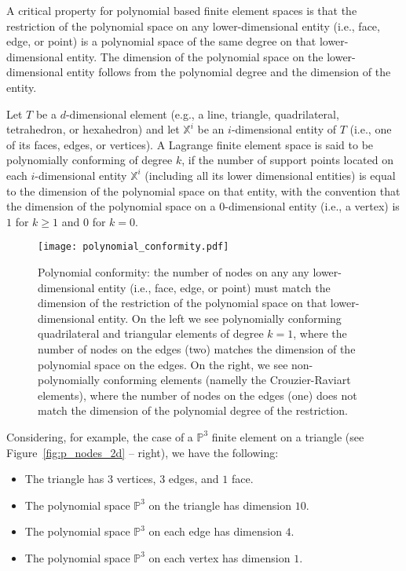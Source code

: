A critical property for polynomial based finite element spaces is that the restriction of the polynomial space on any lower-dimensional entity (i.e., face, edge, or point) is a polynomial space of the same degree on that lower-dimensional entity. The dimension of the polynomial space on the lower-dimensional entity follows from the polynomial degree and the dimension of the entity.

\begin{definition} 
Let $T$ be a $d$-dimensional element (e.g., a line, triangle, quadrilateral, tetrahedron, or hexahedron) and let $\mathbb{X}^i$ be an $i$-dimensional entity of $T$ (i.e., one of its faces, edges, or vertices). A Lagrange finite element space is said to be polynomially conforming of degree $k$, if the number of support points located on each $i$-dimensional entity $\mathbb{X}^i$ (including all its lower dimensional entities) is equal to the dimension of the polynomial space on that entity, with the convention that the dimension of the polynomial space on a $0$-dimensional entity (i.e., a vertex) is $1$ for $k \geq 1$ and $0$ for $k=0$.
\label{def:polynomial_conformity}
\end{definition}

\begin{figure}
\centering
\texttt{[image: polynomial\_conformity.pdf]}
\caption{Polynomial conformity: the number of nodes on any any lower-dimensional entity (i.e., face, edge, or point) must match the dimension of the restriction of the polynomial space on that lower-dimensional entity. On the left we see polynomially conforming quadrilateral and triangular elements of degree $k=1$, where the number of nodes on the edges (two) matches the dimension of the polynomial space on the edges. On the right, we see non-polynomially conforming elements (namelly the Crouzier-Raviart elements), where the number of nodes on the edges (one) does not match the dimension of the polynomial degree of the restriction.}
\label{fig:polynomial_conformity}
\end{figure}

Considering, for example, the case of a $\mathbb{P}^3$ finite element on a triangle (see Figure~\ref{fig:p_nodes_2d} -- right), we have the following:
\begin{itemize}
\item The triangle has $3$ vertices, $3$ edges, and $1$ face.
\item The polynomial space $\mathbb{P}^3$ on the triangle has dimension $10$.
\item The polynomial space $\mathbb{P}^3$ on each edge has dimension $4$.
\item The polynomial space $\mathbb{P}^3$ on each vertex has dimension $1$.
\end{itemize}

